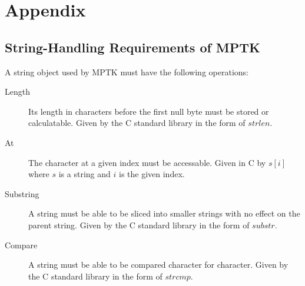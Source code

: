 \documentclass[10pt,a4paper]{article}
\begin{document}
\appendix
\section*{Appendix}
\renewcommand{\thesubsection}{\Alph{subsection}}

\subsection{String-Handling Requirements of MPTK}
\label{sec:StringHandlingRequirementsOfMPTK}
A string object used by MPTK must have the following operations:
\begin{description}
\item[Length] Its length in characters before the first null byte must be stored or calculatable. Given by the C standard library in the form of $strlen$.
\item[At] The character at a given index must be accessable. Given in C by $s[i]$ where $s$ is a string and $i$ is the given index.
\item[Substring] A string must be able to be sliced into smaller strings with no effect on the parent string. Given by the C standard library in the form of $substr$.
\item[Compare] A string must be able to be compared character for character. Given by the C standard library in the form of $strcmp$.
\end{description}
\end{document}
